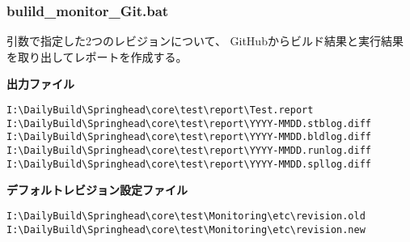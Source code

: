 \subsubsection{bulild\_monitor\_Git.bat}
\label{subsubsec:buildmonitorGit}

\medskip
\noindent
引数で指定した2つのレビジョンについて、
GitHubからビルド結果と実行結果を取り出してレポートを作成する。

\medskip
{}
\begin{Opts}[b]
\end{Opts}
\begin{Args}[b]
\end{Args}

\medskip
\noindent
\bf{出力ファイル}
\begin{narrow}
	\verb|I:\DailyBuild\Springhead\core\test\report\Test.report|\\
	\verb|I:\DailyBuild\Springhead\core\test\report\YYYY-MMDD.stblog.diff|\\
	\verb|I:\DailyBuild\Springhead\core\test\report\YYYY-MMDD.bldlog.diff|\\
	\verb|I:\DailyBuild\Springhead\core\test\report\YYYY-MMDD.runlog.diff|\\
	\verb|I:\DailyBuild\Springhead\core\test\report\YYYY-MMDD.spllog.diff|
\end{narrow}

\medskip
\noindent
\bf{デフォルトレビジョン設定ファイル}
\begin{narrow}
	\verb|I:\DailyBuild\Springhead\core\test\Monitoring\etc\revision.old|\\
	\verb|I:\DailyBuild\Springhead\core\test\Monitoring\etc\revision.new|
\end{narrow}

